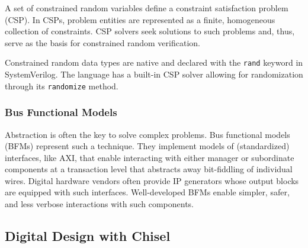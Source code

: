 \documentclass[conference]{IEEEtran}
\begin{document}

A set of constrained random variables define a constraint satisfaction problem (CSP). In CSPs, 
problem entities are represented as a finite, homogeneous collection of constraints. CSP solvers 
seek solutions to such problems and, thus, serve as the basis for constrained random verification.


Constrained random data types are native and declared with the \texttt{rand} keyword in SystemVerilog. 
The language has a built-in CSP solver allowing for randomization through its \texttt{randomize} method.

\subsubsection{Bus Functional Models}

Abstraction is often the key to solve complex problems. Bus functional models (BFMs) represent such 
a technique. They implement models of (standardized) interfaces, like AXI, that enable 
interacting with either manager or subordinate components at a transaction level that abstracts away 
bit-fiddling of individual wires. Digital hardware vendors often provide IP generators whose output 
blocks are equipped with such interfaces. Well-developed BFMs enable simpler, safer, and less 
verbose interactions with such components.

\subsection{Digital Design with Chisel}
\end{document}
